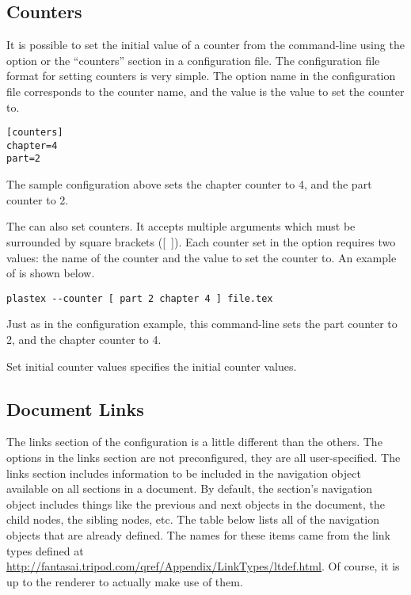 \subsection{Counters}

It is possible to set the initial value of a counter from the
command-line using the  option or the
``counters'' section in a configuration file.  The configuration
file format for setting counters is very simple.  The option name
in the configuration file corresponds to the counter name, and the
value is the value to set the counter to.
\begin{verbatim}
[counters]
chapter=4
part=2
\end{verbatim}

The sample configuration above sets the chapter counter to 4, and the
part counter to 2.

The  can also set counters.  It accepts multiple
arguments which must be surrounded by square brackets ([~]).
Each counter set in the 
option requires two values: the name of the counter and the value to
set the counter to.  An example of  is shown below.
\begin{verbatim}
plastex --counter [ part 2 chapter 4 ] file.tex
\end{verbatim}

Just as in the configuration example, this command-line sets the
part counter to 2, and the chapter counter to 4.

\begin{configuration}{Set initial counter values}
specifies the initial counter values.
\end{configuration}


\subsection{Document Links\label{sec:config-links}}

The links section of the configuration is a little different than the
others.  The options in the links section are not preconfigured, they
are all user-specified.  The links section includes information
to be included in the navigation object available on all sections in
a document.  By default, the section's navigation object includes things
like the previous and next objects in the document, the child nodes,
the sibling nodes, etc.  The table below lists all of the navigation
objects that are already defined.  The names for these items came from
the link types defined at \url{http://fantasai.tripod.com/qref/Appendix/LinkTypes/ltdef.html}.  Of course, it is up to the renderer to actually make use
of them.

